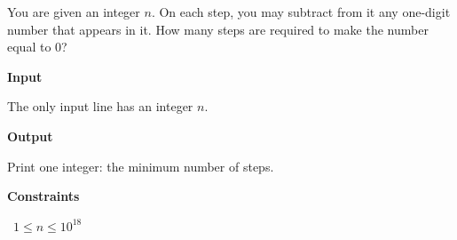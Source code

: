 You are given an integer $n$. On each step, you may subtract from it any one-digit number that appears in it.
How many steps are required to make the number equal to $0$?

\vspace{0.3cm}\noindent\textbf{Input}

The only input line has an integer $n$.

\vspace{0.3cm}\noindent\textbf{Output}

Print one integer: the minimum number of steps.

\vspace{0.3cm}\noindent\textbf{Constraints}

\textbullet\ $1 \le n \le 10^{18}$